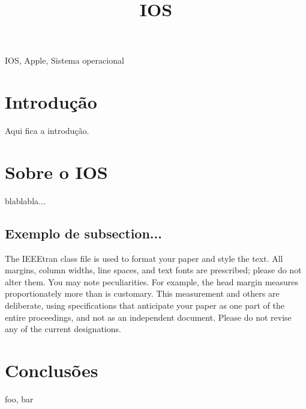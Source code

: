 \documentclass[conference]{IEEEtran}
\begin{document}
\title{IOS}

\author{
}

\maketitle


\begin{abstract}
\lipsum[1]
\end{abstract}

\begin{IEEEkeywords}
IOS, Apple, Sistema operacional
\end{IEEEkeywords}

\section{Introdução}
Aqui fica a introdução. \lipsum[10] \lipsum[5]

\section{Sobre o IOS}
blablabla...\lipsum

\subsection{Exemplo de subsection...}

The IEEEtran class file is used to format your paper and style the text. All margins, 
column widths, line spaces, and text fonts are prescribed; please do not 
alter them. You may note peculiarities. For example, the head margin
measures proportionately more than is customary. This measurement 
and others are deliberate, using specifications that anticipate your paper 
as one part of the entire proceedings, and not as an independent document. 
Please do not revise any of the current designations.

\section{Conclusões}

\lipsum[1] \lipsum[2]

\begin{thebibliography}{00}
 foo, bar
\end{thebibliography}
\end{document}
